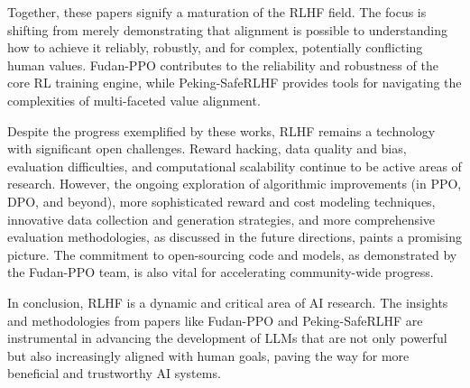 \documentclass{article} %
\begin{document}
Together, these papers signify a maturation of the RLHF field. The focus is shifting from merely demonstrating that alignment is possible to understanding how to achieve it reliably, robustly, and for complex, potentially conflicting human values. Fudan-PPO contributes to the reliability and robustness of the core RL training engine, while Peking-SafeRLHF provides tools for navigating the complexities of multi-faceted value alignment.

Despite the progress exemplified by these works, RLHF remains a technology with significant open challenges. Reward hacking, data quality and bias, evaluation difficulties, and computational scalability continue to be active areas of research. However, the ongoing exploration of algorithmic improvements (in PPO, DPO, and beyond), more sophisticated reward and cost modeling techniques, innovative data collection and generation strategies, and more comprehensive evaluation methodologies, as discussed in the future directions, paints a promising picture. The commitment to open-sourcing code and models, as demonstrated by the Fudan-PPO team, is also vital for accelerating community-wide progress.  

In conclusion, RLHF is a dynamic and critical area of AI research. The insights and methodologies from papers like Fudan-PPO and Peking-SafeRLHF are instrumental in advancing the development of LLMs that are not only powerful but also increasingly aligned with human goals, paving the way for more beneficial and trustworthy AI systems.

\newpage


\end{document}
